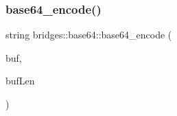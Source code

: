 \subsubsection{\texorpdfstring{base64\+\_\+encode()}{base64\_encode()}}
{\footnotesize\ttfamily string bridges\+::base64\+::base64\+\_\+encode (\begin{DoxyParamCaption}\item[{\mbox{\hyperlink{namespacebridges_a59b77ee45243ba85c701fb8ab298ef00}{B\+Y\+TE}} const $\ast$}]{buf,  }\item[{unsigned int}]{buf\+Len }\end{DoxyParamCaption})}

